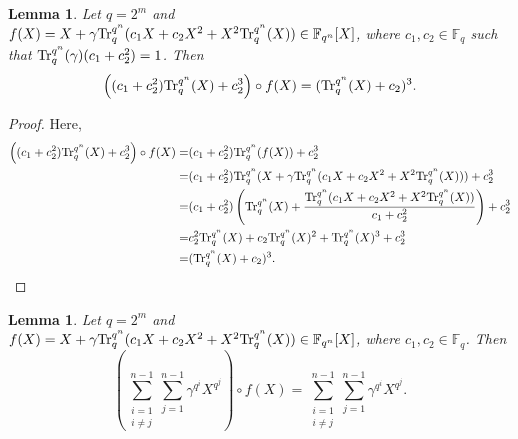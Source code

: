 \documentclass[11pt]{amsart}
\theoremstyle{plain}
\newtheorem{lem}[thm]{Lemma}
\numberwithin{equation}{section}
\theoremstyle{definition}
\newcommand{\F}{\mathbb F}
\def\Tr{{\rm Tr}}
\begin{document}
\begin{lem}\label{L42}
     Let $q=2^m$ and $f(X)=X+\gamma \Tr_{q}^{q^n}(c_1X+c_2X^2+X^2\Tr_{q}^{q^n}(X))\in \F_{q^n}[X]$, where $c_1, c_2 \in \F_q$ such that  $\Tr_{q}^{q^n}(\gamma)(c_1+c_2^2)=1$. Then
     $$\left((c_1+c_2^2)\Tr_{q}^{q^n}(X)+c_2^3\right) \circ f(X)=(\Tr_{q}^{q^n}(X)+c_2)^3.$$
\end{lem}
\begin{proof}
    Here,
    \begin{equation*}
        \begin{split}
            \left((c_1+c_2^2)\Tr_{q}^{q^n}(X)+c_2^3\right) \circ f(X)=&(c_1+c_2^2)\Tr_{q}^{q^n}(f(X))+c_2^3
            \\=&(c_1+c_2^2)\Tr_{q}^{q^n}(X+\gamma \Tr_{q}^{q^n}(c_1X+c_2X^2+X^2\Tr_{q}^{q^n}(X)))+c_2^3
            \\=&(c_1+c_2^2)\left(\Tr_{q}^{q^n}(X)+\frac{\Tr_{q}^{q^n}(c_1X+c_2X^2+X^2\Tr_{q}^{q^n}(X))}{c_1+c_2^2}\right)+c_2^3
            \\=&c_2^2\Tr_{q}^{q^n}(X)+c_2\Tr_{q}^{q^n}(X)^2+\Tr_{q}^{q^n}(X)^3+c_2^3
            \\=&(\Tr_{q}^{q^n}(X)+c_2)^3.
        \end{split}
    \end{equation*}
\end{proof}
\begin{lem}\label{L43}
     Let $q=2^m$ and $f(X)=X+\gamma \Tr_{q}^{q^n}(c_1X+c_2X^2+X^2\Tr_{q}^{q^n}(X))\in \F_{q^n}[X]$, where $c_1, c_2 \in \F_q$. Then
     $$\left(\displaystyle\sum_{\substack{i=1\\ i\neq j}}^{n-1}\sum_{j=1}^{n-1}\gamma^{q^i}X^{q^j}\right) \circ f(X)=\displaystyle\sum_{\substack{i=1\\ i\neq j}}^{n-1}\sum_{j=1}^{n-1}\gamma^{q^i}X^{q^j}.$$
\end{lem}
\end{document}
